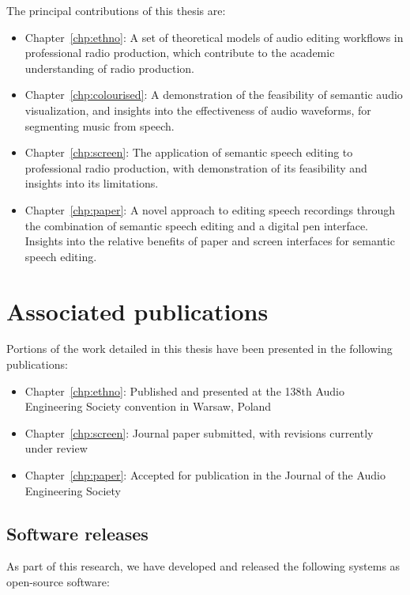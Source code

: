 The principal contributions of this thesis are:
\begin{itemize}
  \item Chapter~\ref{chp:ethno}: 
    A set of theoretical models of audio editing workflows in professional radio production, which contribute to the
    academic understanding of radio production.
  \item Chapter~\ref{chp:colourised}: 
    A demonstration of the feasibility of semantic audio visualization, and insights into the effectiveness of audio
    waveforms, for segmenting music from speech.
  \item Chapter~\ref{chp:screen}: 
    The application of semantic speech editing to professional radio production, with demonstration of its feasibility
    and insights into its limitations. 
  \item Chapter~\ref{chp:paper}:
    A novel approach to editing speech recordings through the combination of semantic speech editing and a digital pen
    interface. Insights into the relative benefits of paper and screen interfaces for semantic speech editing.
\end{itemize}

\section{Associated publications}\label{sec:intro-publications}

Portions of the work detailed in this thesis have been presented in the following publications:


\begin{itemize}
  \item Chapter~\ref{chp:ethno}: Published and presented at the 138th Audio Engineering Society convention in Warsaw,
    Poland \citep{Baume2015}
  \item Chapter~\ref{chp:screen}: Journal paper submitted, with revisions currently under review
  \item Chapter~\ref{chp:paper}: Accepted for publication in the Journal of the Audio Engineering Society
    \citep{Baume2018}
\end{itemize}

\subsection*{Software releases}
As part of this research, we have developed and released the following systems as open-source software:

